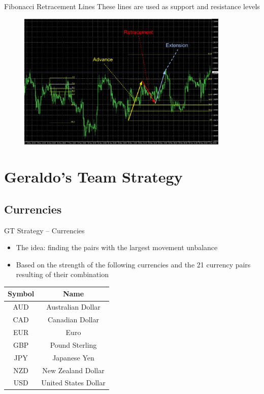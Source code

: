 \documentclass[12pt,portuguese]{beamer}
\begin{document}
\begin{frame}{Fibonacci Retracement Lines}
	These lines are used as support and resistance levels
	\begin{figure}[h]
	\centering
	\includegraphics[width=0.9\textwidth]{images/mt4_fibo.pdf}
	\end{figure}
\end{frame}

\section{Geraldo's Team Strategy}
\subsection{Currencies}
\begin{frame}{GT Strategy -- Currencies}
\begin{itemize}
	\item The idea: finding the pairs with the largest movement unbalance
	\item Based on the strength of the following currencies and the 21 currency pairs resulting of their combination
\end{itemize}

\begin{table}[!htb]
	\centering
	\begin{tabular}{c|c}
		Symbol & Name \\ \hline\hline
		AUD & Australian Dollar \\
		CAD & Canadian Dollar \\
		EUR & Euro\\
		GBP & Pound Sterling \\
		JPY & Japanese Yen \\
		NZD & New Zealand Dollar \\
		USD & United States Dollar \\
	\end{tabular}
\end{table}

\end{frame}
\end{document}
